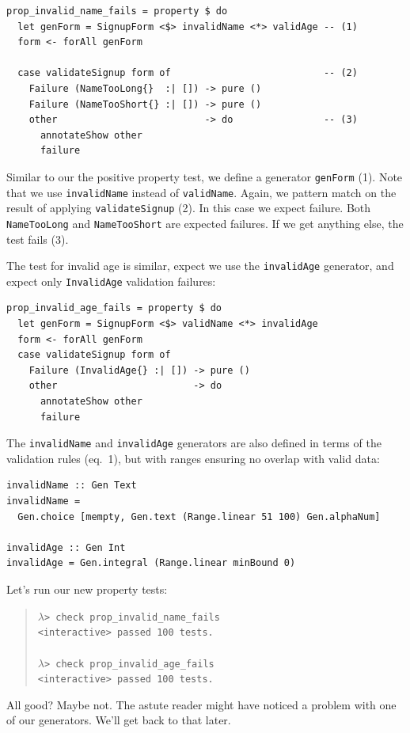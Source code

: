 \begin{verbatim}
prop_invalid_name_fails = property $ do
  let genForm = SignupForm <$> invalidName <*> validAge -- (1)
  form <- forAll genForm

  case validateSignup form of                           -- (2)
    Failure (NameTooLong{}  :| []) -> pure ()
    Failure (NameTooShort{} :| []) -> pure ()
    other                          -> do                -- (3)
      annotateShow other
      failure
\end{verbatim}
Similar to our the positive property test, we define a generator
\texttt{genForm} (1). Note that we use \texttt{invalidName} instead of
\texttt{validName}.
Again, we pattern match on the result of applying
\texttt{validateSignup} (2). In this case we expect failure. Both
\texttt{NameTooLong} and \texttt{NameTooShort} are expected failures. If
we get anything else, the test fails (3).

The test for invalid age is similar, expect we use the
\texttt{invalidAge} generator, and expect only \texttt{InvalidAge}
validation failures:

\begin{verbatim}
prop_invalid_age_fails = property $ do
  let genForm = SignupForm <$> validName <*> invalidAge
  form <- forAll genForm
  case validateSignup form of
    Failure (InvalidAge{} :| []) -> pure ()
    other                        -> do
      annotateShow other
      failure
\end{verbatim}
The \texttt{invalidName} and \texttt{invalidAge} generators are also
defined in terms of the validation rules (eq.~1), but with ranges
ensuring no overlap with valid data:

\begin{verbatim}
invalidName :: Gen Text
invalidName =
  Gen.choice [mempty, Gen.text (Range.linear 51 100) Gen.alphaNum]

invalidAge :: Gen Int
invalidAge = Gen.integral (Range.linear minBound 0)
\end{verbatim}
Let's run our new property tests:

\begin{quote}
$\lambda$\verb|> check prop_invalid_name_fails| \\
  \hspace*{1cm}\checkmark \verb|<interactive> passed 100 tests.| \\
  \\
$\lambda$\verb|> check prop_invalid_age_fails| \\
  \hspace*{1cm}\checkmark \verb|<interactive> passed 100 tests.|
\end{quote}
All good? Maybe not. The astute reader might have noticed a problem with
one of our generators. We'll get back to that later.

